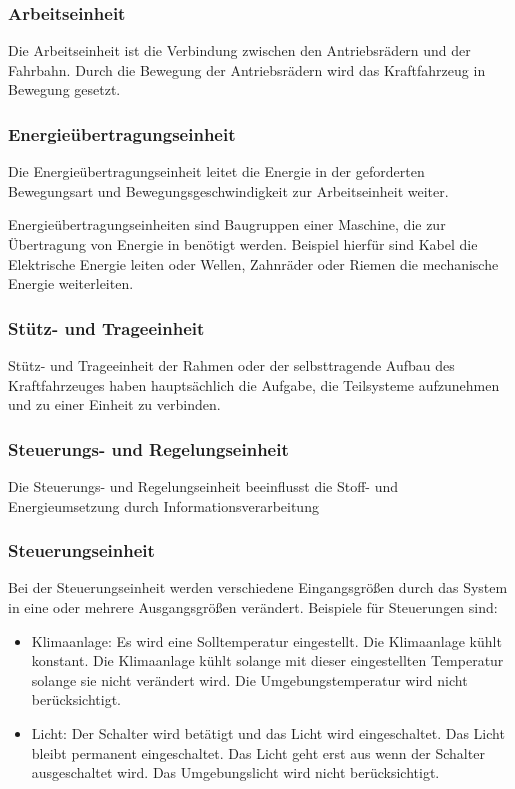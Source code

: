 \subsubsection{Arbeitseinheit}
Die Arbeitseinheit ist die Verbindung zwischen den Antriebsrädern und der Fahrbahn.
Durch die Bewegung der Antriebsrädern wird das Kraftfahrzeug in Bewegung gesetzt.

\subsubsection{Energieübertragungseinheit}
Die Energieübertragungseinheit leitet die Energie in der geforderten Bewegungsart und Bewegungsgeschwindigkeit zur Arbeitseinheit weiter.

Energieübertragungseinheiten sind Baugruppen einer Maschine, die zur Übertragung von Energie in benötigt werden.
Beispiel hierfür sind Kabel die Elektrische Energie leiten oder Wellen, Zahnräder oder Riemen die mechanische Energie weiterleiten.

\subsubsection{Stütz- und Trageeinheit}
Stütz- und Trageeinheit der Rahmen oder der selbsttragende Aufbau des Kraftfahrzeuges haben hauptsächlich die Aufgabe, die Teilsysteme aufzunehmen und zu einer Einheit zu verbinden.


\subsubsection{Steuerungs- und Regelungseinheit}
Die Steuerungs- und Regelungseinheit beeinflusst die Stoff- und Energieumsetzung durch Informationsverarbeitung

\subsubsection{Steuerungseinheit}
Bei der Steuerungseinheit werden verschiedene Eingangsgrößen durch das System in eine oder mehrere Ausgangsgrößen verändert.
Beispiele für Steuerungen sind:
\begin{itemize}
	\item Klimaanlage: Es wird eine Solltemperatur eingestellt.
	      Die Klimaanlage kühlt konstant.
	      Die Klimaanlage kühlt solange mit dieser eingestellten Temperatur solange sie nicht verändert wird.
	      Die Umgebungstemperatur wird nicht berücksichtigt.
	\item Licht: Der Schalter wird betätigt und das Licht wird eingeschaltet.
	      Das Licht bleibt permanent eingeschaltet.
	      Das Licht geht erst aus wenn der Schalter ausgeschaltet wird.
	      Das Umgebungslicht wird nicht berücksichtigt.
\end{itemize}

